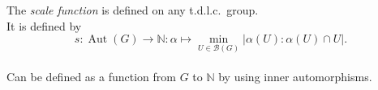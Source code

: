 \documentclass[preview]{standalone}
\begin{document}
The \textit{scale function} is defined on any t.d.l.c.\ group.\\It is defined by \[ s : \operatorname{Aut}(G) \to \mathbb{N} : \alpha \mapsto \min_{U \in \mathcal{B}(G)} |\alpha(U) : \alpha(U) \cap U |. \]\\Can be defined as a function from $G$ to $\mathbb{N}$ by using inner automorphisms.\\
\end{document}
